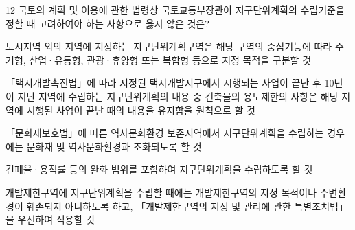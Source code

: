 \begin{question}{12}
국토의 계획 및 이용에 관한 법령상 국토교통부장관이 지구단위계획의 수립기준을 정할 때 고려하여야 하는 사항으로 옳지 않은 것은?
\begin{choices}
  \item 도시지역 외의 지역에 지정하는 지구단위계획구역은 해당 구역의 중심기능에 따라 주거형, 산업·유통형, 관광·휴양형 또는 복합형 등으로 지정 목적을 구분할 것
  \item 「택지개발촉진법」에 따라 지정된 택지개발지구에서 시행되는 사업이 끝난 후 10년이 지난 지역에 수립하는 지구단위계획의 내용 중 건축물의 용도제한의 사항은 해당 지역에 시행된 사업이 끝난 때의 내용을 유지함을 원칙으로 할 것
  \item 「문화재보호법」에 따른 역사문화환경 보존지역에서 지구단위계획을 수립하는 경우에는 문화재 및 역사문화환경과 조화되도록 할 것
  \item 건폐율·용적률 등의 완화 범위를 포함하여 지구단위계획을 수립하도록 할 것
  \item 개발제한구역에 지구단위계획을 수립할 때에는 개발제한구역의 지정 목적이나 주변환경이 훼손되지 아니하도록 하고, 「개발제한구역의 지정 및 관리에 관한 특별조치법」을 우선하여 적용할 것
\end{choices}
\end{question}
